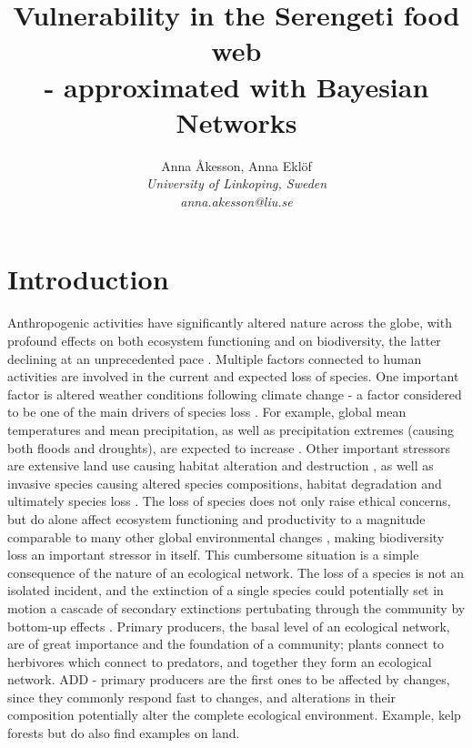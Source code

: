 \documentclass[a4paper,11pt]{article}
\title{Vulnerability in the Serengeti food web\\ - approximated with Bayesian Networks}
\author{Anna {\AA}kesson, Anna Ekl\"of \\
\it \footnotesize University of Linkoping, Sweden\\
\it \footnotesize anna.akesson@liu.se}
\date{}
\begin{document}
\maketitle				
\onehalfspacing

\section*{Introduction}

Anthropogenic activities have significantly altered nature across the globe, with profound effects on both ecosystem functioning and on biodiversity, the latter declining at an unprecedented pace \cite{Diazetal2019}. Multiple factors connected to human activities are involved in the current and expected loss of species. One important factor is altered weather conditions following climate change - a factor considered to be one of the main drivers of species loss \cite{Zedan2004}. For example, global mean temperatures and mean precipitation, as well as precipitation extremes (causing both floods and droughts), are expected to increase \cite{IPCC}. Other important stressors are extensive land use causing habitat alteration and destruction \cite{Diazetal2019, Zedan2004}, as well as invasive species causing altered species compositions, habitat degradation and ultimately species loss \cite{Didhametal2005, MainkaHoward2010}. The loss of species does not only raise ethical concerns, but do alone affect ecosystem functioning and productivity to a magnitude comparable to many other global environmental changes \cite{Hooperetal2012}, making biodiversity loss an important stressor in itself. This cumbersome situation is a simple consequence of the nature of an ecological network. The loss of a species is not an isolated incident, and the extinction of a single species could potentially set in motion a cascade of secondary extinctions pertubating through the community by bottom-up effects \cite{EbenmanJonsson2005}. Primary producers, the basal level of an ecological network, are of great importance and the foundation of a community; plants connect to herbivores which connect to predators, and together they form an ecological network. ADD - primary producers are the first ones to be affected by changes, since they commonly respond fast to changes, and alterations in their composition potentially alter the complete ecological environment. Example, kelp forests but do also find examples on land. 
\end{document}
